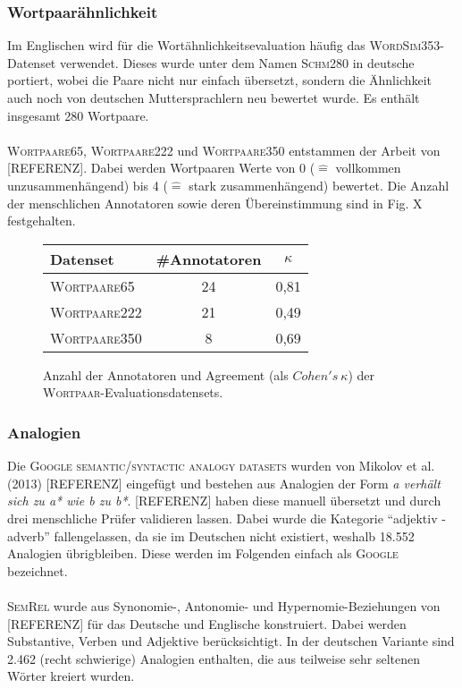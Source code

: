     \subsubsection{Wortpaarähnlichkeit}

    Im Englischen wird für die Wortähnlichkeitsevaluation häufig das \textsc{WordSim353}-Datenset verwendet. Dieses
    wurde unter dem Namen \textsc{Schm280} in deutsche portiert, wobei die Paare nicht nur einfach übersetzt, sondern die
    Ähnlichkeit auch noch von deutschen Muttersprachlern neu bewertet wurde. Es enthält insgesamt 280 Wortpaare.\\ \\
    \textsc{Wortpaare65}, \textsc{Wortpaare222} und \textsc{Wortpaare350} entstammen der Arbeit von [REFERENZ]. Dabei werden Wortpaaren
    Werte von 0 ($\hat{=}$ vollkommen unzusammenhängend) bis 4 ($\hat{=}$ stark zusammenhängend) bewertet. Die Anzahl
    der menschlichen Annotatoren sowie deren Übereinstimmung sind in Fig. X festgehalten.

    \begin{figure}[h]
      \centering
      \begin{tabular}{l|cc}
        Datenset & \#Annotatoren & $\kappa$ \\
        \hline
        \textsc{Wortpaare65} & 24 & 0,81 \\
        \textsc{Wortpaare222} & 21 & 0,49 \\
        \textsc{Wortpaare350} & 8 & 0,69 \\
      \end{tabular}
      \caption{Anzahl der Annotatoren und Agreement (als $Cohen's\ \kappa$) der \textsc{Wortpaar}-Evaluationsdatensets.}
    \end{figure}

    \subsubsection{Analogien}

    Die \textsc{Google semantic/syntactic analogy datasets} wurden von Mikolov et al. (2013) [REFERENZ] eingefügt und bestehen
    aus Analogien der Form \emph{a verhält sich zu a* wie b zu b*}. [REFERENZ] haben diese manuell übersetzt und durch
    drei menschliche Prüfer validieren lassen. Dabei wurde die Kategorie ``adjektiv - adverb'' fallengelassen, da sie
    im Deutschen nicht existiert, weshalb 18.552 Analogien übrigbleiben. Diese werden im Folgenden einfach als
    \textsc{Google} bezeichnet.\\ \\
    \textsc{SemRel} wurde aus Synonomie-, Antonomie- und Hypernomie-Beziehungen von [REFERENZ] für das Deutsche und Englische
    konstruiert. Dabei werden Substantive, Verben und Adjektive berücksichtigt. In der deutschen Variante sind 2.462 (recht schwierige) Analogien enthalten,
    die aus teilweise sehr seltenen Wörter kreiert wurden.

